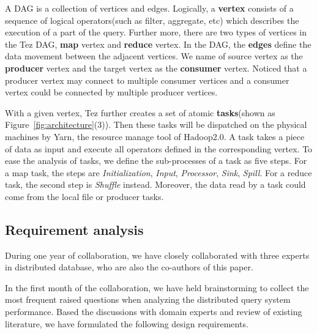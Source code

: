 A DAG is a collection of vertices and edges. Logically, a \textbf{vertex} consists of a sequence of logical operators(such as filter, aggregate, etc) which describes the execution of a part of the query. Further more, there are two types of vertices in the Tez DAG, \textbf{map} vertex and \textbf{reduce} vertex.  
In the DAG,  the \textbf{edges} define the data movement between the adjacent vertices. We name of source vertex as the \textbf{producer} vertex and the target vertex as the \textbf{consumer} vertex. Noticed that a producer vertex may connect to multiple consumer vertices and a consumer vertex could be connected by multiple producer vertices.  

With a given vertex, Tez further creates a set of atomic \textbf{tasks}(shown as Figure~\ref{fig:architecture}(3)). Then these tasks will be dispatched on the physical machines by Yarn, the resource manage tool of Hadoop2.0. A task takes a piece of data as input and execute all operators defined in the corresponding vertex. To ease the analysis of tasks, we define the sub-processes of a task as five steps. For a map task, the steps are \textit{Initialization}, \textit{Input}, \textit{Processor}, \textit{Sink}, \textit{Spill}. For a reduce task, the second step is \textit{Shuffle} instead. Moreover, the data read by a task could come from the local file or producer tasks.

\subsection{Requirement analysis}
During one year of collaboration, we have closely collaborated with three experts in distributed database, who are also the co-authors of this paper.

In the first month of the collaboration, we have held brainstorming to collect the most frequent raised questions when analyzing the distributed query system performance. Based the discussions with domain experts and review of existing literature, we have formulated the following design requirements.

